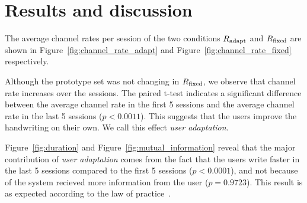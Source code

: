 \documentclass{sigchi}
\begin{document}
\section{Results and discussion}
\label{sec-results}

The average channel rates per session of the two conditions $R_{\mathrm{adapt}}$
and $R_{\mathrm{fixed}}$ are shown in Figure~\ref{fig:channel_rate_adapt} and
Figure~\ref{fig:channel_rate_fixed} respectively.

Although the prototype set was not changing in $R_{\mathrm{fixed}}$, we observe
that channel rate increases over the sessions. The paired t-test
indicates a significant difference between the average channel rate in
the first 5 sessions and the average channel rate in the last 5
sessions ($p < 0.0011$). This suggests that the users improve the
handwriting on their own. We call this effect {\em user
  adaptation}.

Figure~\ref{fig:duration} and Figure~\ref{fig:mutual_information}
reveal that the major contribution of {\em user adaptation} comes from
the fact that the users write faster in the last 5 sessions
compared to the first 5 sessions ($p < 0.0001$), and not because of the
system recieved more information from the user ($p = 0.9723$). This
result is as expected according to the law of practice~\cite{Newell1981}.
\end{document}
